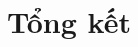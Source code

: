 \documentclass[a4paper, twoside, 12pt]{report}
\theoremstyle{definition}
\begin{document}
% 

% 
% 

% 




% 


% 


% 

% 


% 


\chapter{Tổng kết}



% 

\end{document}
